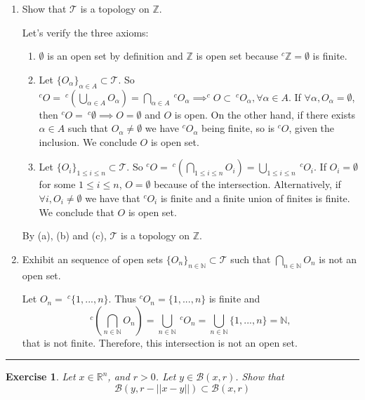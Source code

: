 \documentclass[a4paper,11pt]{article}
\newcommand{\linia}{\rule{\linewidth}{0.5pt}}
\theoremstyle{mytheor}
\theoremstyle{mytheor}
\newtheorem{exercise}{Exercise}
\theoremstyle{remark}
\newcommand{\T}{\mathcal{T}}
\newcommand{\B}{\mathcal{B}}
\newcommand{\Z}{\mathbb{Z}}
\newcommand{\R}{\mathbb{R}}
\begin{document}
\begin{enumerate}
    \item Show that $\T$ is a topology on $\Z$.

    Let's verify the three axioms: 

    \begin{enumerate}
        \item $\emptyset$ is an open set by definition and $\Z$ is open set
        because $^c\Z = \emptyset$ is finite. 

        \item Let $\{O_{\alpha}\}_{\alpha \in A}\subset \T$. So 
        $^cO = ~^c\left(\bigcup_{\alpha \in A} O_{\alpha}\right) = \bigcap_{\alpha
        \in A} ~^cO_{\alpha} \implies ^c O \subset ~^cO_{\alpha}, \forall
        \alpha \in A$. If $\forall \alpha, O_{\alpha} = \emptyset$, then $^cO =
        ~^c\emptyset \implies O = \emptyset$   and $O$ is open. On the other
        hand, if there exists $\alpha \in A$ such that $O_{\alpha} \neq
        \emptyset$ we have $^c O_{\alpha}$ being finite, so is $^c O$, given
        the inclusion. We conclude $O$ is open set. 
        
        \item Let $\{O_{i}\}_{1 \le i \le n} \subset \T$. So 
        $^cO = ~^c\left(\bigcap_{1 \le i \le n} O_i\right) = \bigcup_{1 \le i
        \le n} ~^cO_i$. If $O_i = \emptyset$ for some $1 \le i \le n$, $O =
        \emptyset$ because of the intersection. Alternatively, if $\forall i,
        O_i \neq \emptyset$ we have that $^cO_i$ is finite and a finite union
        of finites is finite. We conclude that $O$ is open set.
    \end{enumerate}
    By (a), (b) and (c), $\T$ is a topology on $\Z$. 

    \item Exhibit an sequence of open sets $\{O_n\}_{n\in\mathbb{N}} \subset
    \T$ such that $\bigcap_{n \in \mathbb{N}} O_n$ is not an open
    set.

    Let $O_n = ~^c\{1, ..., n\}$. Thus $^c O_n = \{1,...,n\}$ is finite and
    $$^c\left(\bigcap_{n \in \mathbb{N}} O_n\right) = \bigcup_{n \in
    \mathbb{N}} ~^cO_n = \bigcup_{n \in
    \mathbb{N}} \{1,...,n\} = \mathbb{N},$$
    that is not finite. Therefore, this intersection is not an open set.     
    
\end{enumerate}

\noindent\linia

\begin{exercise}
    Let $x \in \R^n$, and $r > 0$. Let $y \in \B(x, r)$. Show that
    $$\B(y,r - ||x-y||) \subset \B(x,r)$$
\end{exercise}
\end{document}
